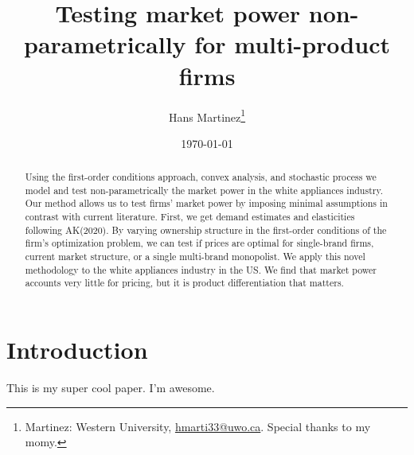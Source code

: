 \documentclass[AER]{AEA}
\begin{document}
\title{Testing market power non-parametrically for multi-product firms}



\author{
  Hans Martinez\thanks{
  Martinez: Western
University, \href{mailto:hmarti33@uwo.ca}{hmarti33@uwo.ca}.
  Special thanks to my momy.
}
}

\date{\today}

\begin{abstract}
Using the first-order conditions approach, convex analysis, and
stochastic process we model and test non-parametrically the market power
in the white appliances industry. Our method allows us to test firms'
market power by imposing minimal assumptions in contrast with current
literature. First, we get demand estimates and elasticities following
AK(2020). By varying ownership structure in the first-order conditions
of the firm's optimization problem, we can test if prices are optimal
for single-brand firms, current market structure, or a single
multi-brand monopolist. We apply this novel methodology to the white
appliances industry in the US. We find that market power accounts very
little for pricing, but it is product differentiation that matters.
\end{abstract}


\maketitle

\hypertarget{introduction}{%
\section*{Introduction}\label{introduction}}

This is my super cool paper. I'm awesome.
\end{document}
